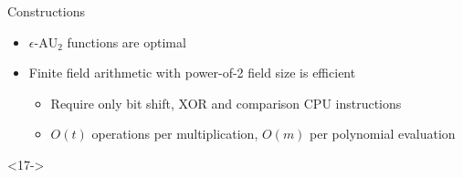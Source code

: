 \documentclass[xcolor=dvipsnames]{beamer}
\newcommand{\?}{\mathrel{?}} %
\newcommand{\frA}{\mathfrak{A}}
\newcommand{\frC}{\mathfrak{C}}
\newcommand{\AU}{\mathrm{AU}_{2}}
\newcommand{\eAU}{\epsilon\text{-}\AU}
\begin{document}
\begin{frame}{Constructions}
\begin{onlyenv}
\begin{itemize}[<+->]
      \item \(\eAU\) functions are optimal
      \item Finite field arithmetic with power-of-2 field size is efficient
        \begin{itemize}
          \item Require only bit shift, XOR and comparison CPU instructions
          \item \(O(t)\) operations per multiplication, \(O(m)\) per polynomial evaluation
        \end{itemize}
    \end{itemize}
  \end{onlyenv}
  \begin{onlyenv}<17->
    \begin{figure}
    \end{figure}
  \end{onlyenv}
\end{frame}

\newcommand{\insec}{\frC_{A \leftrightarrow B}}
\newcommand{\authkt}{\frA^{k+t}_{A \to B}}
\newcommand{\authm}{\frA^{m}_{A \to B}}
\newcommand{\Ei}{{\rm Ei}}
\end{document}
